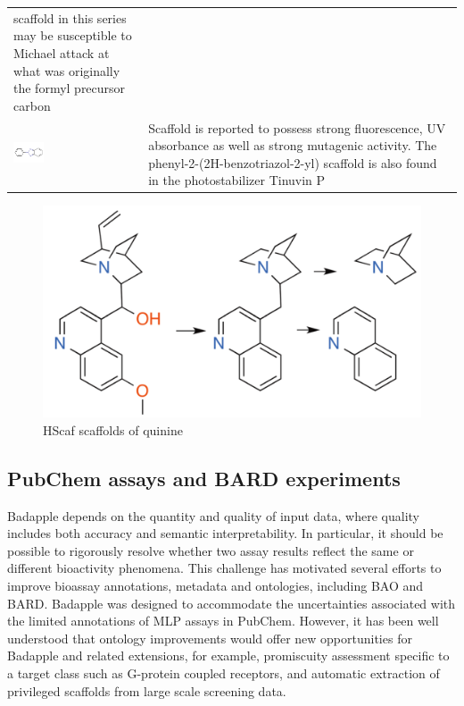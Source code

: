 \begin{table}
\begin{tabular}{p{0.3\linewidth}p{0.7\linewidth}}
scaffold in this series may be susceptible to Michael attack at what was originally the formyl precursor carbon \\
\includegraphics[align=t,width=0.25\textwidth]{data/badapple/medchem_05.png} & Scaffold is reported to possess strong fluorescence, UV absorbance as well as strong mutagenic activity\cite{Oda2008-at}. The phenyl-2-(2H-benzotriazol-2-yl) scaffold is also found in the photostabilizer Tinuvin P \\
\hline
\end{tabular}
\label{table:ba_cmp_medchem}
\end{table}

\begin{figure}
	\includegraphics[width=\textwidth]{figures/badapple/Badapple_Fig5.png}
	\caption{HScaf scaffolds of quinine}
	\label{fig:BA_05}
\end{figure}

\subsection{PubChem assays and BARD experiments}

Badapple depends on the quantity and quality of input data, where quality includes both accuracy and semantic interpretability. In particular, it should be possible to rigorously resolve whether two assay results reflect the same or different bioactivity phenomena. This challenge has motivated several efforts to improve bioassay annotations, metadata and ontologies, including BAO and BARD. Badapple was designed to accommodate the uncertainties associated with the limited annotations of MLP assays in PubChem. However, it has been well understood that ontology improvements would offer new opportunities for Badapple and related extensions, for example, promiscuity assessment specific to a target class such as G-protein coupled receptors, and automatic extraction of privileged scaffolds from large scale screening data.

